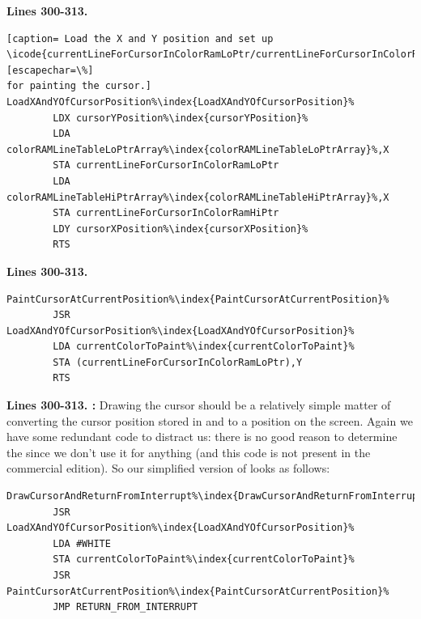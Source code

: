 \bigskip
\textbf{Lines 300-313. }
\begin{lstlisting}[escapechar=\%][caption= Load the X and Y position and set up \icode{currentLineForCursorInColorRamLoPtr/currentLineForCursorInColorRamHiPtr}[escapechar=\%]
for painting the cursor.]
LoadXAndYOfCursorPosition%\index{LoadXAndYOfCursorPosition}%   
        LDX cursorYPosition%\index{cursorYPosition}%
        LDA colorRAMLineTableLoPtrArray%\index{colorRAMLineTableLoPtrArray}%,X
        STA currentLineForCursorInColorRamLoPtr
        LDA colorRAMLineTableHiPtrArray%\index{colorRAMLineTableHiPtrArray}%,X
        STA currentLineForCursorInColorRamHiPtr
        LDY cursorXPosition%\index{cursorXPosition}%
        RTS 
\end{lstlisting}
\bigskip
\textbf{Lines 300-313. }
\begin{lstlisting}[caption = Paint the cursor.,escapechar=\%]
PaintCursorAtCurrentPosition%\index{PaintCursorAtCurrentPosition}%   
        JSR LoadXAndYOfCursorPosition%\index{LoadXAndYOfCursorPosition}%
        LDA currentColorToPaint%\index{currentColorToPaint}%
        STA (currentLineForCursorInColorRamLoPtr),Y
        RTS 
\end{lstlisting}
\clearpage

\textbf{Lines 300-313. :} Drawing the cursor should be a relatively simple matter
of converting the cursor position stored in  and  to a position on the screen. Again
we have some redundant code to distract us: there is no good reason to determine the  since we don't use it
for anything (and this code is not present in the commercial edition). So our simplified version of 
looks as follows:
\begin{lstlisting}[escapechar=\%]
DrawCursorAndReturnFromInterrupt%\index{DrawCursorAndReturnFromInterrupt}%   
        JSR LoadXAndYOfCursorPosition%\index{LoadXAndYOfCursorPosition}%
        LDA #WHITE
        STA currentColorToPaint%\index{currentColorToPaint}%
        JSR PaintCursorAtCurrentPosition%\index{PaintCursorAtCurrentPosition}%
        JMP RETURN_FROM_INTERRUPT
\end{lstlisting}


